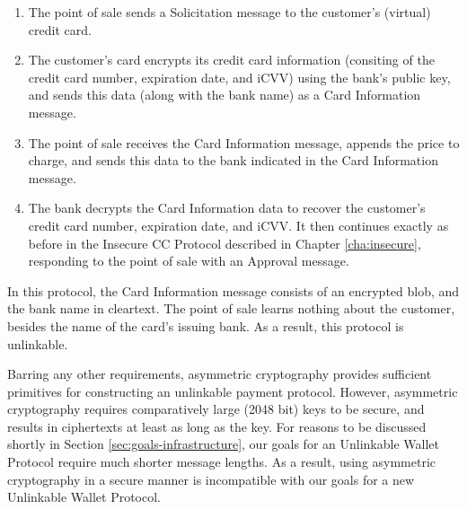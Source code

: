 \begin{enumerate}
    \item The point of sale sends a Solicitation message to the customer's (virtual) credit card.
    \item The customer's card encrypts its credit card information (consiting of the credit card number, expiration date, and iCVV) using the bank's public key,
        and sends this data (along with the bank name) as a Card Information message.
    \item The point of sale receives the Card Information message, appends the price to charge, and sends this data to the bank indicated in the Card Information message.
    \item The bank decrypts the Card Information data to recover the customer's credit card number, expiration date, and iCVV.
        It then continues exactly as before in the Insecure CC Protocol described in Chapter \ref{cha:insecure}, responding to the point of sale with an Approval message.
\end{enumerate}

In this protocol, the Card Information message consists of an encrypted blob, and the bank name in cleartext.
The point of sale learns nothing about the customer, besides the name of the card's issuing bank.
As a result, this protocol is unlinkable.

Barring any other requirements, asymmetric cryptography provides sufficient primitives for constructing an unlinkable payment protocol.
However, asymmetric cryptography requires comparatively large (2048 bit) keys to be secure, and results in ciphertexts at least as long as the key.
For reasons to be discussed shortly in Section \ref{sec:goals-infrastructure}, our goals for an Unlinkable Wallet Protocol require much shorter message lengths.
As a result, using asymmetric cryptography in a secure manner is incompatible with our goals for a new Unlinkable Wallet Protocol.
